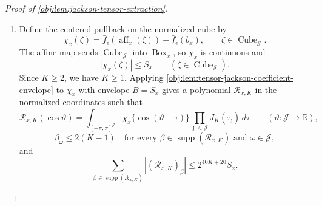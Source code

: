 \begin{proof}[Proof of \cref{obj:lem:jackson-tensor-extraction}]
\begin{enumerate}
Also \(0\le u_{a1}/s_a(u)\le1\) and
\[
0\le s_a(u)-\epsilon s(u)
\le
\{s_a(u)-s_a(w)\}-\epsilon\{s(u)-s(w)\},
\]
which yields
\[
\begin{aligned}
g_{a,\epsilon}(u)-g_{a,\epsilon}(w)
&\ge
\frac{u_{a1}-w_{a1}-s_a(u)+s_a(w)+\epsilon\{s(u)-s(w)\}}{\epsilon}\\
&=
\epsilon^{-1}(w_{a0}-u_{a0})+\{s(u)-s(w)\}\\
&\ge
-(1+\epsilon^{-1})\delta_{\mathcal J}(u,w).
\end{aligned}
\]
Thus, for both arms,
\[
|g_{a,\epsilon}(u)-g_{a,\epsilon}(w)|
\le
(1+\epsilon^{-1})\delta_{\mathcal J}(u,w).
\]
Since
\[
|\max\{\rho_0,\rho_1\}-\max\{\sigma_0,\sigma_1\}|
\le
\max_{a\in\{0,1\}}|\rho_a-\sigma_a|,
\]
\cref{obj:def:global-extension} gives
\[
|\bar f_\epsilon(u)-\bar f_\epsilon(w)|
\le
(1+\epsilon^{-1})\delta_{\mathcal J}(u,w).
\]
Consequently \(\bar f_\epsilon\) is continuous on \(\operatorname{Box}_x\), and for every
\(y\in\operatorname{Box}_x\),
\[
|\bar f_\epsilon(y)-\bar f_\epsilon(b_x)|
\le
(1+\epsilon^{-1})\sum_{\jmath\in\mathcal J}|y_\jmath-b_{\jmath,x}|
\le
(1+\epsilon^{-1})\sum_{\jmath\in\mathcal J}r_{\jmath,x}.
\]
Set
\[
S_x
=
(1+\epsilon^{-1})\sum_{\jmath\in\mathcal J}r_{\jmath,x}.
\]

\item Define the centered pullback on the normalized cube by
\[
\chi_x(\zeta)
=
\bar f_\epsilon(\operatorname{aff}_x(\zeta))-\bar f_\epsilon(b_x),
\qquad
\zeta\in\operatorname{Cube}_{\mathcal J}.
\]
The affine map sends \(\operatorname{Cube}_{\mathcal J}\) into \(\operatorname{Box}_x\), so \(\chi_x\) is continuous and
\[
|\chi_x(\zeta)|\le S_x
\qquad(\zeta\in\operatorname{Cube}_{\mathcal J}).
\]
Since \(K\ge2\), we have \(K\ge1\). Applying \cref{obj:lem:tensor-jackson-coefficient-envelope} to \(\chi_x\) with envelope \(B=S_x\) gives a polynomial \(\mathcal R_{x,K}\) in the normalized coordinates such that
\[
\mathcal R_{x,K}(\cos\vartheta)
=
\int_{[-\pi,\pi]^{\mathcal J}}
\chi_x\{\cos(\vartheta-\tau)\}
\prod_{\jmath\in\mathcal J}J_K(\tau_\jmath)\,d\tau
\qquad(\vartheta:\mathcal J\to\mathbb R),
\]
\[
\beta_\omega\le 2(K-1)
\quad
\text{for every }\beta\in\operatorname{supp}(\mathcal R_{x,K})
\text{ and }\omega\in\mathcal J,
\]
and
\[
\sum_{\beta\in\operatorname{supp}(\mathcal R_{x,K})}
|(\mathcal R_{x,K})_\beta|
\le
2^{40K+20}S_x .
\]


\end{enumerate}
\end{proof}
